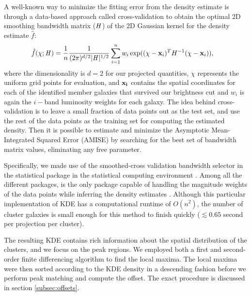 A well-known way to minimize the fitting error from the density estimate is through
a data-based approach called cross-validation to obtain 
the optimal 2D smoothing
bandwidth matrix ($\mathbf{\it H}$) of the 2D Gaussian kernel for the
density estimate $\hat{f}$:
\begin{align}
	\hat{f}(\chi; \mathbf{\it H}) &= \frac{1}{n} \frac{1}{(2\pi)^{d/2}|\mathbf{\it H}|^{1/2}}
	\sum_{i=1}^n w_i \exp((\chi-{\bf x}_i)^T H^{-1} (\chi-{\bf x}_i)),
	\label{eq:cross_validated_bandwidth}
\end{align}
where the dimensionality is $d=2$ for our projected quantities,
$\chi$ represents the uniform grid points for evaluation, and 
$\bf{x}_i$ contains the spatial coordinates for each of the identified member 
galaxies that survived our brightness cut and $w_i$ is again the $i-$band
luminosity weights for each galaxy.
The idea behind cross-validation is to leave a small fraction of data points 
out as the test set, and use the rest of the data points as 
the training set for computing the estimated density.
Then it is possible to estimate and minimize the Asymptotic Mean-Integrated Squared Error
(AMISE)  by searching
for the best set of bandwidth matrix values, eliminating any free parameter. 

Specifically, we made use of the smoothed-cross validation \citep{Hall1992} 
bandwidth selector in the statistical package {} \citep{Duong2007} 
in the {} statistical computing environment \citep{R_core}. 
Among all the different {} packages, {} is the
only package capable of handling the magnitude weights of the data points 
while inferring the density estimates \citep{Deng2011}. 
Although this particular implementation of KDE has a computational runtime of $O(n^2)$, 
the number of cluster galaxies is
small enough for this method to finish quickly ($\lesssim 0.65$ second per
projection per cluster). 

The resulting KDE contains rich information about the spatial distribution of
the clusters, and we focus on the peak regions.  
We employed both a first and second-order  
finite differencing algorithm to find the local maxima.  
The local maxima were then sorted according to the KDE density in a descending
fashion before we perform peak matching and compute the offset. The exact
procedure is discussed in section \ref{subsec:offsets}. 

